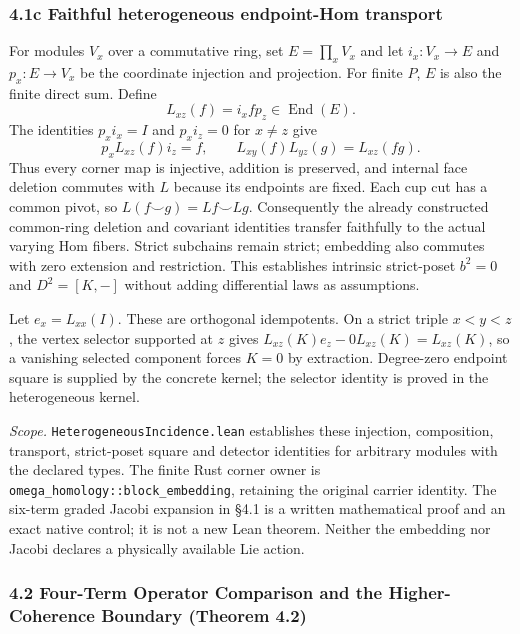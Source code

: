 \documentclass[
  english,
  10pt,
  a4paper,
]{article}
\begin{document}
\subsubsection{4.1c Faithful heterogeneous endpoint-Hom
transport}\label{c-faithful-heterogeneous-endpoint-hom-transport}

For modules \(V_x\) over a commutative ring, set \(E=\prod_xV_x\) and
let \(i_x:V_x\to E\) and \(p_x:E\to V_x\) be the coordinate injection
and projection. For finite \(P\), \(E\) is also the finite direct sum.
Define \[
L_{xz}(f)=i_x f p_z\in\operatorname{End}(E).
\] The identities \(p_xi_x=I\) and \(p_xi_z=0\) for \(x\ne z\) give \[
p_xL_{xz}(f)i_z=f,\qquad
L_{xy}(f)L_{yz}(g)=L_{xz}(fg).
\] Thus every corner map is injective, addition is preserved, and
internal face deletion commutes with \(L\) because its endpoints are
fixed. Each cup cut has a common pivot, so \(L(f\smile g)=Lf\smile Lg\).
Consequently the already constructed common-ring deletion and covariant
identities transfer faithfully to the actual varying Hom fibers. Strict
subchains remain strict; embedding also commutes with zero extension and
restriction. This establishes intrinsic strict-poset \(b^2=0\) and
\(D^2=[K,-]\) without adding differential laws as assumptions.

Let \(e_x=L_{xx}(I)\). These are orthogonal idempotents. On a strict
triple \(x<y<z\), the vertex selector supported at \(z\) gives
\(L_{xz}(K)e_z-0L_{xz}(K)=L_{xz}(K)\), so a vanishing selected component
forces \(K=0\) by extraction. Degree-zero endpoint square is supplied by
the concrete kernel; the selector identity is proved in the
heterogeneous kernel.

\emph{Scope.} \nolinkurl{HeterogeneousIncidence.lean} establishes these
injection, composition, transport, strict-poset square and detector
identities for arbitrary modules with the declared types. The finite
Rust corner owner is \nolinkurl{omega_homology::block_embedding},
retaining the original carrier identity. The six-term graded Jacobi
expansion in §4.1 is a written mathematical proof and an exact native
control; it is not a new Lean theorem. Neither the embedding nor Jacobi
declares a physically available Lie action.

\subsubsection{4.2 Four-Term Operator Comparison and the
Higher-Coherence Boundary (Theorem
4.2)}\label{four-term-operator-comparison-and-the-higher-coherence-boundary-theorem-4.2}
\end{document}
